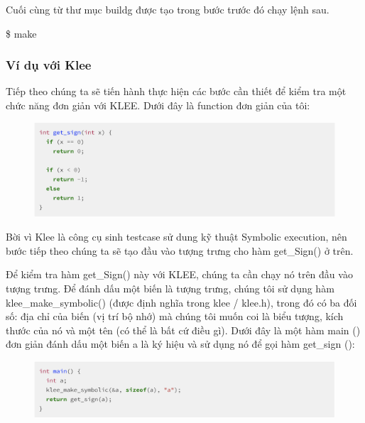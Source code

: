 \documentclass[12pt,a4paper]{article}
\begin{document}
Cuối cùng từ thư mục buildg được tạo trong bước trước đó chạy lệnh sau.

\$ make

\subsubsection{Ví dụ với Klee}

Tiếp theo chúng ta sẽ tiến hành thực hiện các bước cần thiết để kiểm tra một chức năng đơn giản với KLEE. Dưới đây là function đơn giản của tôi:

\begin{figure}[ht]
\begin{center}
\includegraphics[scale=.3]{hinhanh/functionexample.png}
\end{center}
\end{figure}

Bời vì Klee là công cụ sinh testcase sử dung kỹ thuật Symbolic execution, nên bước tiếp theo chúng ta sẽ tạo đầu vào tượng trưng cho hàm get\_Sign() ở trên.

Để kiểm tra hàm get\_Sign() này với KLEE, chúng ta cần chạy nó trên đầu vào tượng trưng. Để đánh dấu một biến là tượng trưng, chúng tôi sử dụng hàm klee\_make\_symbolic() (được định nghĩa trong klee / klee.h), trong đó có ba đối số: địa chỉ của biến (vị trí bộ nhớ) mà chúng tôi muốn coi là biểu tượng, kích thước của nó và một tên (có thể là bất cứ điều gì). Dưới đây là một hàm main () đơn giản đánh dấu một biến a là ký hiệu và sử dụng nó để gọi
hàm get\_sign ():

\begin{figure}[ht]
\begin{center}
\includegraphics[scale=.3]{hinhanh/mainexample.png}
\end{center}
\end{figure}
\end{document}
